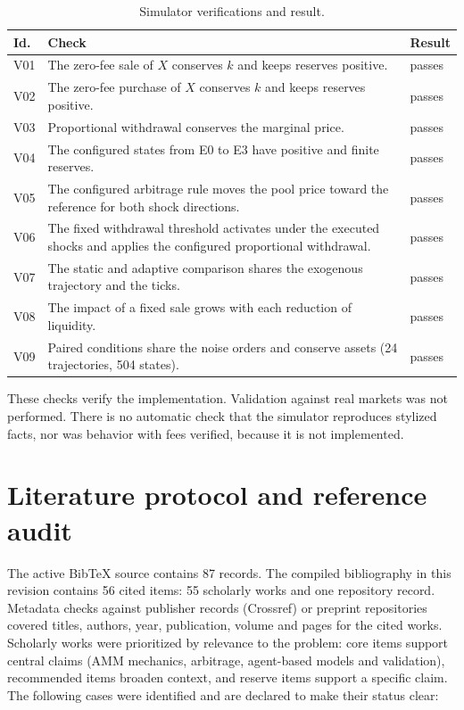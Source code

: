 \begin{table}[htbp]
\centering
\caption{Simulator verifications and result.}
\label{tab:verificacion}
\small
\begin{tabularx}{\textwidth}{@{}l X l@{}}
\toprule
Id. & Check & Result \\
\midrule
V01 & The zero-fee sale of $X$ conserves $k$ and keeps reserves positive. & passes \\
V02 & The zero-fee purchase of $X$ conserves $k$ and keeps reserves positive. & passes \\
V03 & Proportional withdrawal conserves the marginal price. & passes \\
V04 & The configured states from E0 to E3 have positive and finite reserves. & passes \\
V05 & The configured arbitrage rule moves the pool price toward the reference for both shock directions. & passes \\
V06 & The fixed withdrawal threshold activates under the executed shocks and applies the configured proportional withdrawal. & passes \\
V07 & The static and adaptive comparison shares the exogenous trajectory and the ticks. & passes \\
V08 & The impact of a fixed sale grows with each reduction of liquidity. & passes \\
V09 & Paired conditions share the noise orders and conserve assets (24 trajectories, 504 states). & passes \\
\bottomrule
\end{tabularx}
\end{table}

These checks verify the implementation. Validation against real markets was not performed. There is no automatic check that the simulator reproduces stylized facts, nor was behavior with fees verified, because it is not implemented.

\section{Literature protocol and reference audit}
\label{sec:protocolo-literatura}

The active BibTeX source contains 87 records. The compiled bibliography in this revision contains 56 cited items: 55 scholarly works and one repository record. Metadata checks against publisher records (Crossref) or preprint repositories covered titles, authors, year, publication, volume and pages for the cited works. Scholarly works were prioritized by relevance to the problem: core items support central claims (AMM mechanics, arbitrage, agent-based models and validation), recommended items broaden context, and reserve items support a specific claim. The following cases were identified and are declared to make their status clear:


